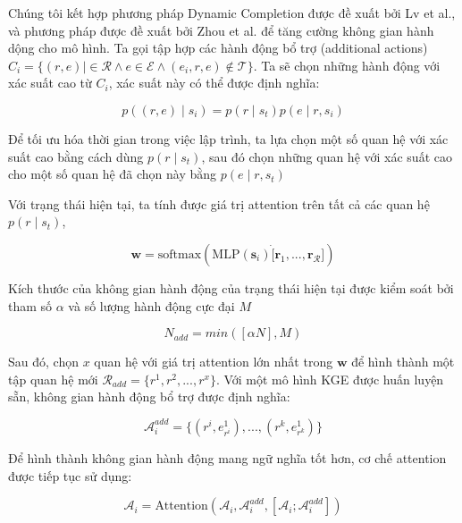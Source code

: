 Chúng tôi kết hợp phương pháp Dynamic Completion được đề xuất bởi Lv et al.\cite{lv2020dynamic}, và phương pháp được đề xuất bởi Zhou et al.\cite{zhou2021multi}
để tăng cường không gian hành dộng cho mô hình. Ta gọi tập hợp các hành động bổ trợ (additional actions) 
$C_i = \{(r, e) | \in \mathcal{R} \wedge e \in \mathcal{E} \wedge (e_i, r, e) \notin \mathcal{T}\}$. Ta sẽ chọn những hành động
với xác suất cao từ $C_i$, xác suất này có thể được định nghĩa:

\begin{equation}
    p((r, e) \mid s_i) = p(r \mid s_t)p(e \mid r, s_i)
\end{equation}

Để tối ưu hóa thời gian trong việc lập trình, ta lựa chọn một số quan hệ với xác suất cao bằng cách dùng $p(r \mid s_t)$, sau đó 
chọn những quan hệ với xác suất cao cho một số quan hệ đã chọn này bằng $p(e \mid r, s_t)$

Với trạng thái hiện tại, ta tính được giá trị attention trên tất cả các quan hệ $p(r \mid s_t)$,

\begin{equation}
    \mathbf{w} = \text{softmax}(\text{MLP}(\mathbf{s}_i) \dot [\mathbf{r}_1, ..., \mathbf{r}_\mathcal{R}])
\end{equation}

Kích thước của không gian hành động của trạng thái hiện tại được kiểm soát bởi tham số $\alpha$ và số lượng hành động cực đại $M$

\begin{equation}
    N_{add} = min([\alpha N], M)
\end{equation}

Sau đó, chọn $x$ quan hệ với giá trị attention lớn nhất trong $\mathbf{w}$ để hình thành một tập quan hệ mới $\mathcal{R}_{add} = \{r^1, r^2, ..., r^x\}$. 
Với một mô hình KGE được huấn luyện sẵn, không gian hành động bổ trợ được định nghĩa:

\begin{equation}
    \mathcal{A}_i^{add} = \{(r^i, e_{r^i}^1), ..., (r^k, e_{r^k}^1)\}
\end{equation}

Để hình thành không gian hành động mang ngữ nghĩa tốt hơn, cơ chế attention được tiếp tục sử dụng:

\begin{equation}
    \mathcal{A}_i = \text{Attention}(\mathcal{A}_i, \mathcal{A}_i^{add}, [\mathcal{A}_i;\mathcal{A}_i^{add} ])
\end{equation}

